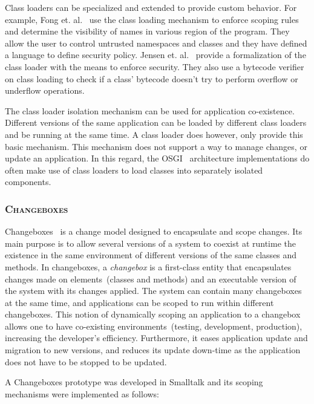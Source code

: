 Class loaders can be specialized and extended to provide custom behavior. For example, Fong et. al.~\cite{Fong10a} use the class loading mechanism to enforce scoping rules and determine the visibility of names in various region of the program. They allow the user to control untrusted
namespaces and classes and they have defined a language to define security policy. Jensen et. al.~\cite{Jens98a} provide a formalization of the class loader with the means to enforce security. They also use a bytecode verifier on class loading to check if a class' bytecode doesn't try to perform overflow or underflow operations.

The class loader isolation mechanism can be used for application co-existence. Different versions of the same application can be loaded by different class loaders and be running at the same time. A class loader does however, only provide this basic mechanism.  This mechanism does not support a way to manage changes, or update an application. In this regard, the OSGI~\cite{OSGI} architecture implementations do often make use of class loaders to load classes into separately isolated components.

\subsubsection*{\textsc{Changeboxes}}

Changeboxes~\cite{Denk07c} is a change model designed to encapsulate and scope changes. Its main purpose is to allow several versions of a system to coexist at runtime \ie the existence in the same environment of different versions of the same classes and methods. In changeboxes, a \emph{changebox} is a first-class entity that encapsulates changes made on elements~(classes and methods) and an executable version of the system with its changes applied. The system can contain many changeboxes at the same time, and applications can be scoped to run within different changeboxes. This notion of dynamically scoping an application to a changebox allows one to have co-existing environments~(\eg testing, development, production), increasing the developer's efficiency. Furthermore, it eases application update and migration to new versions, and reduces its update down-time as the application does not have to be stopped to be updated.

A Changeboxes prototype was developed in Smalltalk and its scoping mechanisms were implemented as follows:

